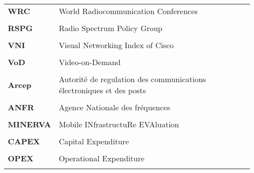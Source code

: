 \begin{longtable}{ p{2.5cm} p{10cm}}
  \bf WRC &  World Radiocommunication Conferences \\ \\
  \bf RSPG &  Radio Spectrum Policy Group \\ \\
  \bf VNI &  Visual Networking Index of Cisco  \\ \\
	\bf VoD &  Video-on-Demand \\ \\
  \bf Arcep &  Autorité de regulation des communications électroniques et des posts \\ \\
  \bf ANFR &  Agence Nationale des fréquences \\ \\
	\bf MINERVA &  Mobile INfrastructuRe EVAluation \\ \\
  \bf CAPEX &  Capital Expenditure  \\ \\
  \bf OPEX &  Operational Expenditure \\ \\
\end{longtable}
\par